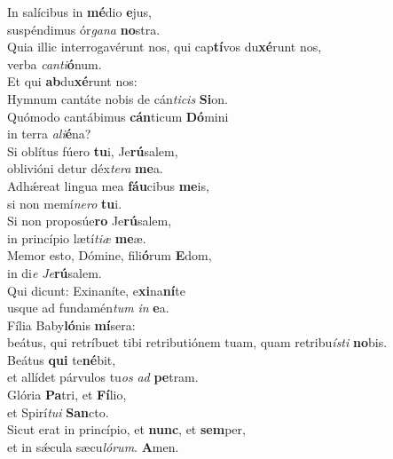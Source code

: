 \evenverse In salícibus in \textbf{mé}dio \textbf{e}jus,~\*\\
\evenverse suspéndimus ór\textit{ga}\textit{na} \textbf{no}stra.\\
\oddverse Quia illic interrogavérunt nos, qui cap\textbf{tí}vos du\textbf{xé}runt nos,~\*\\
\oddverse verba \textit{can}\textit{ti}\textbf{ó}num.\\
\evenverse Et qui \textbf{ab}du\textbf{xé}runt nos:~\*\\
\evenverse Hymnum cantáte nobis de cán\textit{ti}\textit{cis} \textbf{Si}on.\\
\oddverse Quómodo cantábimus \textbf{cán}ticum \textbf{Dó}mini~\*\\
\oddverse in terra \textit{a}\textit{li}\textbf{é}na?\\
\evenverse Si oblítus fúero \textbf{tu}i, Je\textbf{rú}salem,~\*\\
\evenverse oblivióni detur déx\textit{te}\textit{ra} \textbf{me}a.\\
\oddverse Adhǽreat lingua mea \textbf{fáu}cibus \textbf{me}is,~\*\\
\oddverse si non memí\textit{ne}\textit{ro} \textbf{tu}i.\\
\evenverse Si non proposúe\textbf{ro} Je\textbf{rú}salem,~\*\\
\evenverse in princípio lætí\textit{ti}\textit{æ} \textbf{me}æ.\\
\oddverse Memor esto, Dómine, fili\textbf{ó}rum \textbf{E}dom,~\*\\
\oddverse in di\textit{e} \textit{Je}\textbf{rú}salem.\\
\evenverse Qui dicunt: Exinaníte, e\textbf{xi}na\textbf{ní}te~\*\\
\evenverse usque ad fundamén\textit{tum} \textit{in} \textbf{e}a.\\
\oddverse Fília Baby\textbf{ló}nis \textbf{mí}sera:~\*\\
\oddverse beátus, qui retríbuet tibi retributiónem tuam, quam retribu\textit{í}\textit{sti} \textbf{no}bis.\\
\evenverse Beátus \textbf{qui} te\textbf{né}bit,~\*\\
\evenverse et allídet párvulos tu\textit{os} \textit{ad} \textbf{pe}tram.\\
\oddverse Glória \textbf{Pa}tri, et \textbf{Fí}lio,~\*\\
\oddverse et Spirí\textit{tu}\textit{i} \textbf{San}cto.\\
\evenverse Sicut erat in princípio, et \textbf{nunc}, et \textbf{sem}per,~\*\\
\evenverse et in sǽcula sæcu\textit{ló}\textit{rum}. \textbf{A}men.\\

